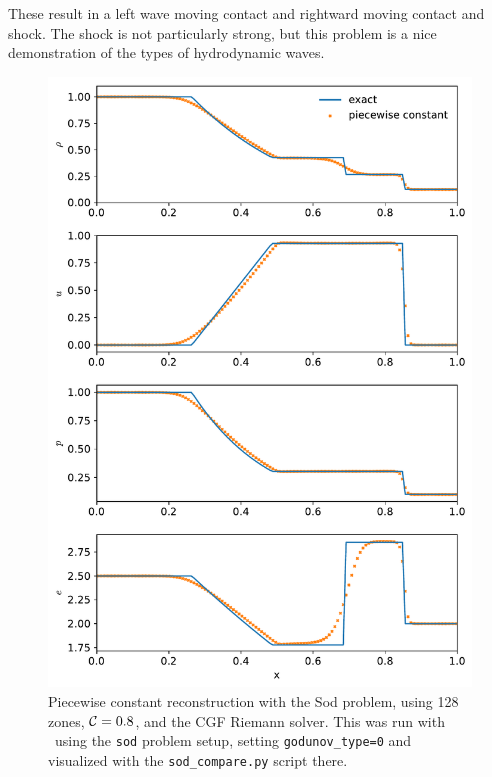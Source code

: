 These result in a left wave moving contact and rightward moving
contact and shock.  The shock is not particularly strong, but this
problem is a nice demonstration of the types of hydrodynamic waves.

\begin{figure}[t]
\centering
\includegraphics[width=0.7\linewidth]{hydro1d_god_sod}
\caption{\label{fig:Euler:sod:god} Piecewise constant reconstruction
  with the Sod problem, using 128 zones, ${\mathcal{C}} = 0.8$, and the CGF
  Riemann solver.  This was run with \hydrooned\ using the {\tt sod}
  problem setup, setting {\tt godunov\_type=0} and visualized with the
  {\tt sod\_compare.py} script there.}
\end{figure}

